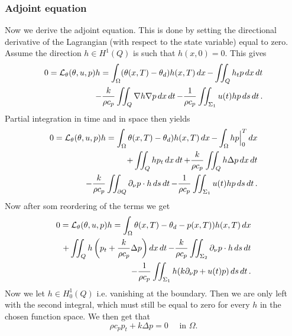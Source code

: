 \subsubsection{Adjoint equation}
Now we derive the adjoint equation. This is done by  setting the directional derivative of the Lagrangian (with respect to the state variable) equal to zero. Assume the direction $h\in H^1(Q)$ is such that $h(x, 0) = 0$. %
This gives
\begin{equation}
  \begin{aligned}
  0 = \mathcal{L}_\theta(\theta, u, p)h = \int_\Omega (\theta(x,T) - \theta_d)h(x, T)\mathop{dx} - \iint_Q h_t p\mathop{dx}\mathop{dt} \\
  - \frac{k}{\rho c_p}\iint_Q\nabla h\nabla p \mathop{dx}\mathop{dt}
  - \frac{1}{\rho c_p}\iint_{\Sigma_1} u(t)h p\mathop{ds}\mathop{dt}.
  \end{aligned}
\end{equation}
Partial integration in time and in space then yields
\begin{equation} %
  \begin{aligned}
  0 = \L_\theta(\theta, u, p)h = \int_\Omega \theta(x,T) - \theta_d)h(x, T)\dx - \int_\Omega hp\Big|_0^T \dx \\
  + \iint_Q h p_t\dxdt
  + \frac{k}{\rho c_p}\iint_Q h\Delta p \dxdt \\
  - \frac{k}{\rho c_p} \iint_{\partial Q}\partial_\nu p\cdot h\dsdt
  - \frac{1}{\rho c_p}\iint_{\Sigma_1} u(t)h p\dsdt.
  \end{aligned}
\end{equation}
Now after som reordering of the terms we get
\begin{equation}
  \begin{aligned}
  0 = \mathcal{L}_\theta(\theta, u, p)h = \int_\Omega \theta(x,T) - \theta_d-p(x, T))h(x, T)\mathop{dx} \\
  + \iint_Q h \left( p_t + \frac{k}{\rho c_p}\Delta p\right) \mathop{dx}\mathop{dt}
   - \frac{k}{\rho c_p} \iint_{\Sigma_2}\partial_\nu p\cdot h\mathop{ds}\mathop{dt} \\
   - \frac{1}{\rho c_p} \iint_{\Sigma_1}h(  k\partial_\nu p + u(t)p )\mathop{ds}\mathop{dt}.
  \end{aligned}
\end{equation}
Now we let $h\in H_0^1(Q)$ i.e. vanishing at the boundary. Then we are only left with the second integral, which must still be equal to zero for every $h$ in the chosen function space. We then get that
\begin{equation*}
  \rho c_p p_t + k\Delta p = 0 \quad\textrm{ in } \Omega.
\end{equation*}
